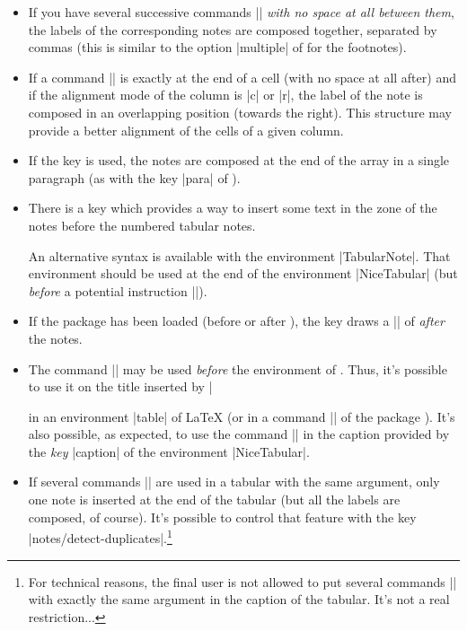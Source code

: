 \documentclass[dvipsnames]{article}
\begin{document}
\bigskip
\begin{itemize}
\item If you have several successive commands || \emph{with no
space at all between them}, the labels of the corresponding notes are composed
together, separated by commas (this is similar to the option |multiple| of
 for the footnotes).

\item If a command || is exactly at the end of a cell (with no
space at all after) and if the alignment mode of the column is |c| or |r|, the
label of the note is composed in an overlapping position (towards the right).
This structure may provide a better alignment of the cells of a given column.

\item If the key  is used, the notes are composed at the
end of the array in a single paragraph (as with the key |para| of
). 

\item {}
There is a key  which provides a way to insert some text
in the zone of the notes before the numbered tabular notes.

An alternative syntax is available with the environment |{TabularNote}|. That
environment should be used at the end of the environment |{NiceTabular}| (but
\emph{before} a potential instruction |\CodeAfter|).

\item If the package  has been loaded (before or after
), the key  draws a |\bottomrule|
of  \emph{after} the notes. 

\item The command |\tabularnote| may be used \emph{before}
the environment of . Thus, it's possible to use it on the
title inserted by |\caption| in an environment |{table}| of LaTeX (or in a
command |\captionof| of the package ). It's also possible, as
expected, to use the command |\tabularnote| in the caption provided by the
\emph{key} |caption| of the environment |{NiceTabular}|.

\item If several commands |\tabularnote| are used in a tabular with the same
argument, only one note is inserted at the end of the tabular (but all the
labels are composed, of course). It's possible to control that feature with
the key |notes/detect-duplicates|.\footnote{For technical reasons, the final
user is not allowed to put several commands |\tabularnote| with exactly the
same argument in the caption of the tabular. It's not a real restriction...}


\end{itemize}
\end{document}
